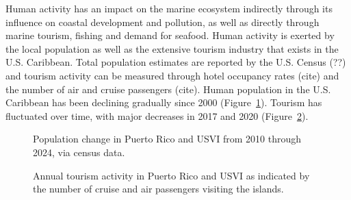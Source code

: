 \documentclass[
  letterpaper,
  oneside,
  open=any]{scrbook}
\begin{document}
Human activity has an impact on the marine ecosystem indirectly through
its influence on coastal development and pollution, as well as directly
through marine tourism, fishing and demand for seafood. Human activity
is exerted by the local population as well as the extensive tourism
industry that exists in the U.S. Caribbean. Total population estimates
are reported by the U.S. Census (??) and tourism activity can be
measured through hotel occupancy rates (cite) and the number of air and
cruise passengers (cite). Human population in the U.S. Caribbean has
been declining gradually since 2000 (Figure~\ref{fig-pop}). Tourism has
fluctuated over time, with major decreases in 2017 and 2020
(Figure~\ref{fig-tourist}).

\begin{figure}


\caption{\label{fig-pop}Population change in Puerto Rico and USVI from
2010 through 2024, via census data.}

\end{figure}%

\begin{figure}


\caption{\label{fig-tourist}Annual tourism activity in Puerto Rico and
USVI as indicated by the number of cruise and air passengers visiting
the islands.}

\end{figure}%
\end{document}
